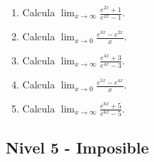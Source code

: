 \documentclass[11pt,a4paper]{article}
\begin{document}
\begin{enumerate}[label=\textbf{E\arabic*.},start=361]
\item Calcula $\displaystyle\lim_{x\to\infty}\frac{e^{2x}+1}{e^{2x}-1}$.

\item Calcula $\displaystyle\lim_{x\to0}\frac{e^{3x}-e^{2x}}{x}$.

\item Calcula $\displaystyle\lim_{x\to\infty}\frac{e^{4x}+3}{e^{4x}-3}$.

\item Calcula $\displaystyle\lim_{x\to0}\frac{e^{5x}-e^{4x}}{x}$.

\item Calcula $\displaystyle\lim_{x\to\infty}\frac{e^{6x}+5}{e^{6x}-5}$.

\end{enumerate}

\newpage

\subsection{Nivel 5 - Imposible}
\end{document}
